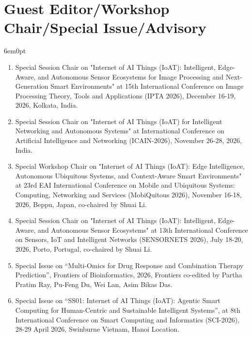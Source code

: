 \documentclass[11pt,a4paper]{moderncv}
\begin{document}
\section{\textbf{Guest Editor/Workshop Chair/Special Issue/Advisory}}

\begin{adjustwidth}{6em}{0pt}
	\begin{enumerate}
		
		
		
		\item Special Session Chair on "Internet of AI Things (IoAT): Intelligent, Edge-Aware, and Autonomous Sensor Ecosystems for Image Processing and Next-Generation Smart Environments" at 15th International Conference on Image Processing Theory, Tools and Applications (IPTA 2026), December 16-19, 2026, Kolkata, India.


		\item Special Session Chair on "Internet of AI Things (IoAT) for Intelligent Networking and Autonomous Systems" at International Conference on Artificial Intelligence and Networking (ICAIN-2026), November 26-28, 2026, India.
		

		\item Special Workshop Chair on "Internet of AI Things (IoAT): Edge Intelligence, Autonomous Ubiquitous Systems, and Context-Aware Smart Environments" at 23rd EAI International Conference on Mobile and Ubiquitous Systems: Computing, Networking and Services (MobiQuitous 2026), November 16-18, 2026, Beppu, Japan, co-chaired by Shuai Li.
		
		\item Special Session Chair on "Internet of AI Things (IoAT): Intelligent, Edge-Aware, and Autonomous Sensor Ecosystems" at 13th International Conference on Sensors, IoT and Intelligent Networks (SENSORNETS 2026), July 18-20, 2026, Porto, Portugal, co-chaired by Shuai Li.
				
		\item Special Issue on “Multi-Omics for Drug Response and Combination Therapy Prediction”, Frontiers of Bioinformatics, 2026, Frontiers co-edited by Partha Pratim Ray, Pu-Feng Du, Wei Lan, Asim Bikas Das. 
	
		\item Special Issue on “SS01: Internet of AI Things (IoAT): Agentic Smart Computing for Human-Centric and Sustainable Intelligent Systems”, at 8th International Conference on Smart Computing and Informatics (SCI-2026), 28-29 April 2026, Swinburne Vietnam, Hanoi Location. 
	

\end{enumerate}
\end{adjustwidth}
\end{document}
